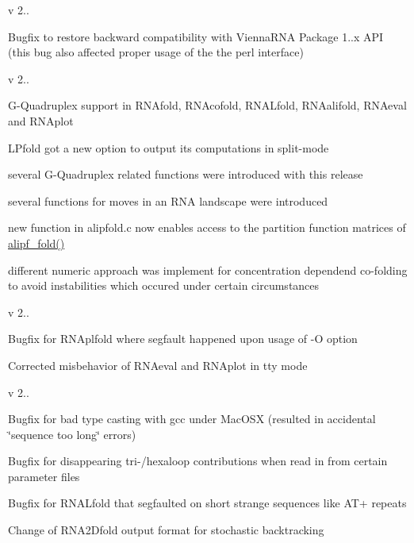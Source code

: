 v 2..
\begin{DoxyItemize}
\item Bugfix to restore backward compatibility with Vienna\+R\+NA Package 1..\+x A\+PI (this bug also affected proper usage of the the perl interface)
\end{DoxyItemize}

v 2..
\begin{DoxyItemize}
\item G-\/\+Quadruplex support in R\+N\+Afold, R\+N\+Acofold, R\+N\+A\+Lfold, R\+N\+Aalifold, R\+N\+Aeval and R\+N\+Aplot
\item L\+Pfold got a new option to output its computations in split-\/mode
\item several G-\/\+Quadruplex related functions were introduced with this release
\item several functions for moves in an R\+NA landscape were introduced
\item new function in alipfold.\+c now enables access to the partition function matrices of \hyperlink{group__consensus__pf__fold_ga1a5f6cfb9d761fa862ce4edc7c369cd2}{alipf\+\_\+fold()}
\item different numeric approach was implement for concentration dependend co-\/folding to avoid instabilities which occured under certain circumstances
\end{DoxyItemize}

v 2..
\begin{DoxyItemize}
\item Bugfix for R\+N\+Aplfold where segfault happened upon usage of -\/O option
\item Corrected misbehavior of R\+N\+Aeval and R\+N\+Aplot in tty mode
\end{DoxyItemize}

v 2..
\begin{DoxyItemize}
\item Bugfix for bad type casting with gcc under Mac\+O\+SX (resulted in accidental \char`\"{}sequence too long\char`\"{} errors)
\item Bugfix for disappearing tri-\//hexaloop contributions when read in from certain parameter files
\item Bugfix for R\+N\+A\+Lfold that segfaulted on short strange sequences like A\+T+ repeats
\item Change of R\+N\+A2\+Dfold output format for stochastic backtracking
\end{DoxyItemize}

